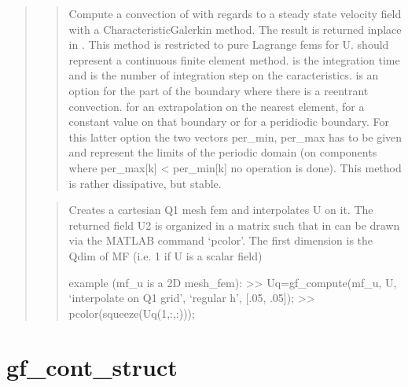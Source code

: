 \documentclass[a4paper,11pt,english]{sphinxmanual}
\begin{document}
\begin{quote}
\sphinxAtStartPar
{}
\begin{quote}

\sphinxAtStartPar
Compute a convection of  with regards to a steady state velocity
field  with a Characteristic\sphinxhyphen{}Galerkin method. The result is returned
in\sphinxhyphen{}place in .
This method is restricted to pure Lagrange fems for U.  should
represent a continuous finite element method.  is the integration time
and  is the number of integration step on the caracteristics. 
is an option for the part of the boundary where there is a re\sphinxhyphen{}entrant
convection.
 for an extrapolation on the nearest element,
 for a constant value on that boundary or
 for a peridiodic boundary. For this latter option
the two vectors per\_min, per\_max has to be given and represent the limits
of the periodic domain (on components where per\_max{[}k{]} \textless{} per\_min{[}k{]}
no operation is done).
This method is rather dissipative, but stable.
\end{quote}

\sphinxAtStartPar
{}
\begin{quote}

\sphinxAtStartPar
Creates a cartesian Q1 mesh fem and interpolates U on it. The
returned field U2 is organized in a matrix such that in can be drawn
via the MATLAB command ‘pcolor’. The first dimension is the Qdim of
MF (i.e.  1 if U is a scalar field)

\sphinxAtStartPar
example (mf\_u is a 2D mesh\_fem):
\textgreater{}\textgreater{} Uq=gf\_compute(mf\_u, U, ‘interpolate on Q1 grid’, ‘regular h’, {[}.05, .05{]});
\textgreater{}\textgreater{} pcolor(squeeze(Uq(1,:,:)));
\end{quote}
\end{quote}


\section{gf\_cont\_struct}
\label{\detokenize{matlab_octave/cmdref_gf_cont_struct:gf-cont-struct}}\label{\detokenize{matlab_octave/cmdref_gf_cont_struct::doc}}
\sphinxAtStartPar
{}
\end{document}
